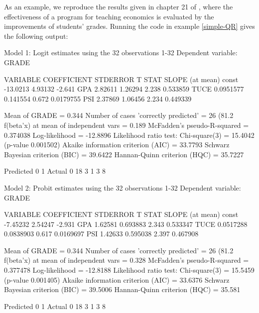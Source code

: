 As an example, we reproduce the results given in chapter 21 of
\cite{greene00}, where the effectiveness of a program for teaching
economics is evaluated by the improvements of students' grades.
Running the code in example \ref{simple-QR} gives the following
output:
\begin{code}

Model 1: Logit estimates using the 32 observations 1-32
Dependent variable: GRADE

      VARIABLE       COEFFICIENT        STDERROR      T STAT       SLOPE
                                                                  (at mean)
  const               -13.0213           4.93132      -2.641
  GPA                   2.82611          1.26294       2.238      0.533859   
  TUCE                  0.0951577        0.141554      0.672      0.0179755  
  PSI                   2.37869          1.06456       2.234      0.449339   

  Mean of GRADE = 0.344
  Number of cases 'correctly predicted' = 26 (81.2%
  f(beta'x) at mean of independent vars = 0.189
  McFadden's pseudo-R-squared = 0.374038
  Log-likelihood = -12.8896
  Likelihood ratio test: Chi-square(3) = 15.4042 (p-value 0.001502)
  Akaike information criterion (AIC) = 33.7793
  Schwarz Bayesian criterion (BIC) = 39.6422
  Hannan-Quinn criterion (HQC) = 35.7227

           Predicted
             0    1
  Actual 0  18    3
         1   3    8

Model 2: Probit estimates using the 32 observations 1-32
Dependent variable: GRADE

      VARIABLE       COEFFICIENT        STDERROR      T STAT       SLOPE
                                                                  (at mean)
  const                -7.45232          2.54247      -2.931
  GPA                   1.62581          0.693883      2.343      0.533347   
  TUCE                  0.0517288        0.0838903     0.617      0.0169697  
  PSI                   1.42633          0.595038      2.397      0.467908   

  Mean of GRADE = 0.344
  Number of cases 'correctly predicted' = 26 (81.2%
  f(beta'x) at mean of independent vars = 0.328
  McFadden's pseudo-R-squared = 0.377478
  Log-likelihood = -12.8188
  Likelihood ratio test: Chi-square(3) = 15.5459 (p-value 0.001405)
  Akaike information criterion (AIC) = 33.6376
  Schwarz Bayesian criterion (BIC) = 39.5006
  Hannan-Quinn criterion (HQC) = 35.581

           Predicted
             0    1
  Actual 0  18    3
         1   3    8

\end{code}

